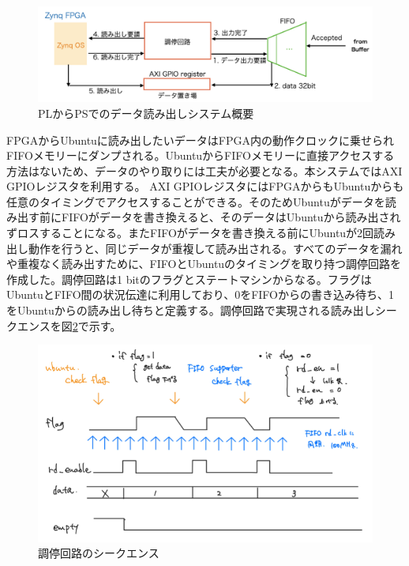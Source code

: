 \begin{figure} 
\centering
\includegraphics[width=16cm]{fig/QAQC/JATHubarbitator.png}
\caption[PLからPSでのデータ読み出しシステム概要]{PLからPSでのデータ読み出しシステム概要}
\label{JATHubarbitor}
\end{figure}

FPGAからUbuntuに読み出したいデータはFPGA内の動作クロックに乗せられFIFOメモリーにダンプされる。UbuntuからFIFOメモリーに直接アクセスする方法はないため、データのやり取りには工夫が必要となる。本システムではAXI GPIOレジスタを利用する。
AXI GPIOレジスタにはFPGAからもUbuntuからも任意のタイミングでアクセスすることができる。そのためUbuntuがデータを読み出す前にFIFOがデータを書き換えると、そのデータはUbuntuから読み出されずロスすることになる。またFIFOがデータを書き換える前にUbuntuが2回読み出し動作を行うと、同じデータが重複して読み出される。すべてのデータを漏れや重複なく読み出すために、FIFOとUbuntuのタイミングを取り持つ調停回路を作成した。調停回路は1 bitのフラグとステートマシンからなる。フラグはUbuntuとFIFO間の状況伝達に利用しており、0をFIFOからの書き込み待ち、1をUbuntuからの読み出し待ちと定義する。調停回路で実現される読み出しシークエンスを図\ref{JATHubarbitation}で示す。
\begin{figure} 
\centering
\includegraphics[width=16cm]{fig/QAQC/JATHubarbitation.png}
\caption[調停回路のシークエンス]{調停回路のシークエンス}
\label{JATHubarbitation}
\end{figure}

